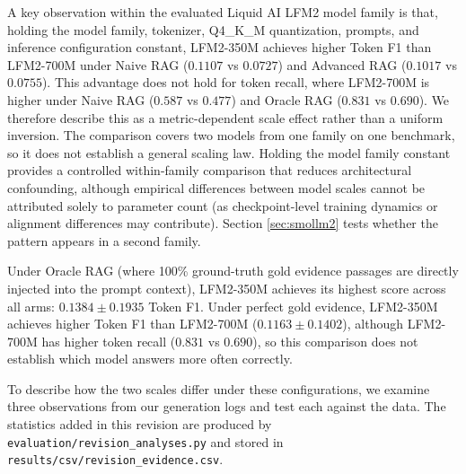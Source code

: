\documentclass[10pt]{article}
\begin{document}
A key observation within the evaluated Liquid AI LFM2 model family is that, holding the model family, tokenizer, Q4\_K\_M quantization, prompts, and inference configuration constant, LFM2-350M achieves higher Token F1 than LFM2-700M under Naive RAG ($0.1107$ vs $0.0727$) and Advanced RAG ($0.1017$ vs $0.0755$). This advantage does not hold for token recall, where LFM2-700M is higher under Naive RAG ($0.587$ vs $0.477$) and Oracle RAG ($0.831$ vs $0.690$). We therefore describe this as a metric-dependent scale effect rather than a uniform inversion. The comparison covers two models from one family on one benchmark, so it does not establish a general scaling law. Holding the model family constant provides a controlled within-family comparison that reduces architectural confounding, although empirical differences between model scales cannot be attributed solely to parameter count (as checkpoint-level training dynamics or alignment differences may contribute). Section \ref{sec:smollm2} tests whether the pattern appears in a second family.

Under Oracle RAG (where 100\% ground-truth gold evidence passages are directly injected into the prompt context), LFM2-350M achieves its highest score across all arms: $0.1384 \pm 0.1935$ Token F1. Under perfect gold evidence, LFM2-350M achieves higher Token F1 than LFM2-700M ($0.1163 \pm 0.1402$), although LFM2-700M has higher token recall ($0.831$ vs $0.690$), so this comparison does not establish which model answers more often correctly.

To describe how the two scales differ under these configurations, we examine three observations from our generation logs and test each against the data. The statistics added in this revision are produced by \texttt{evaluation/revision\_analyses.py} and stored in \texttt{results/csv/revision\_evidence.csv}.
\end{document}
